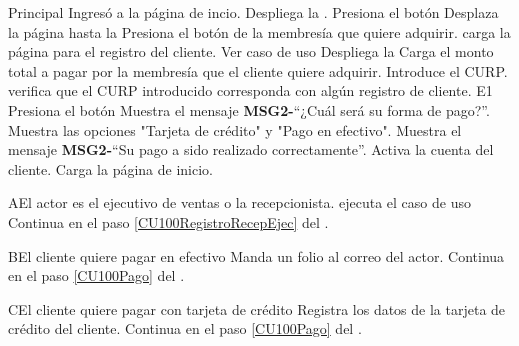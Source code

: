 	\begin{UCtrayectoria}{Principal}
		\UCpaso[\UCactor] Ingresó a la página de incio. 
		\UCpaso Despliega la  \label{CU100RegistroRecepEjec}.
		\UCpaso [\UCactor] Presiona el botón 
		\UCpaso Desplaza la página hasta la 
		\UCpaso [\UCactor] Presiona el botón  de la membresía que quiere adquirir.
		\UCpaso carga la página para el registro del cliente. Ver caso de uso 
		\UCpaso Despliega la 
		\UCpaso Carga el monto total a pagar por la membresía que el cliente quiere adquirir.
		\UCpaso [\UCactor] Introduce el CURP.
		\UCpaso verifica que el CURP introducido corresponda con algún registro de cliente. E1 \label{CU100CURP}
		\UCpaso [\UCactor] Presiona el botón 
		\UCpaso Muestra el mensaje {\bf MSG2-}``¿Cuál será su forma de pago?''.
		\UCpaso Muestra las opciones "Tarjeta de crédito" y "Pago en efectivo". 
		\UCpaso Muestra el mensaje {\bf MSG2-}``Su pago a sido realizado correctamente''. \label{CU100Pago}
		\UCpaso Activa la cuenta del cliente.
		\UCpaso Carga la página de inicio. 
	\end{UCtrayectoria}
		
		\begin{UCtrayectoriaA}{A}{El actor es el ejecutivo de ventas o la recepcionista.}
			\UCpaso[\UCactor] ejecuta el caso de uso 
			\UCpaso Continua en el paso \ref{CU100RegistroRecepEjec} del .
		\end{UCtrayectoriaA}
		
		\begin{UCtrayectoriaA}{B}{El cliente quiere pagar en efectivo}
			\UCpaso Manda un folio al correo del actor.
			\UCpaso Continua en el paso \ref{CU100Pago} del . 
		\end{UCtrayectoriaA}

		\begin{UCtrayectoriaA}{C}{El cliente quiere pagar con tarjeta de crédito}
			\UCpaso Registra los datos de la tarjeta de crédito del cliente.
			\UCpaso Continua en el paso \ref{CU100Pago} del . 
		\end{UCtrayectoriaA}		
		
